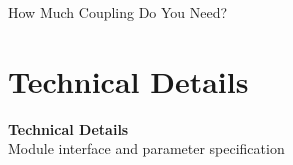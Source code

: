 \documentclass[aspectratio=169]{beamer}
\begin{document}
\begin{frame}{How Much Coupling Do You Need?}
\end{frame}

\section{Technical Details}

\begin{frame}[plain]
	\centering
	\vfill
	{\Large\bfseries Technical Details}\\[10pt]
	{\large\color{gray} Module interface and parameter specification}
	\vfill
\end{frame}
\end{document}
